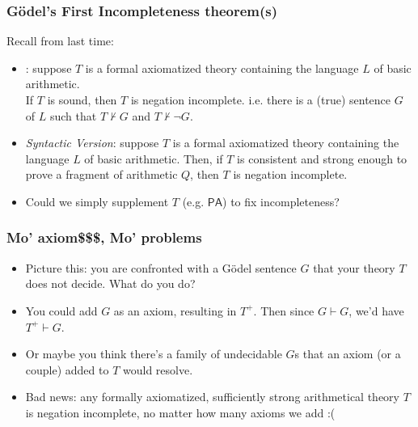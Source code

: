 \begin{frame}
\frametitle{G\"odel's First Incompleteness theorem(s)}

Recall from last time:

\begin{itemize}[<+->]

\item {}: suppose $T$ is a formal axiomatized theory containing the language $L$ of basic arithmetic. \\ If $T$ is \textcolor{OGlyallpink}{sound}, then $T$ is negation incomplete. i.e. there is a (\textcolor{OGlyallpink}{true}) sentence $G$ of $L$ such that $T \nvdash G$ and $T \nvdash \neg G$. 

\item \emph{Syntactic Version}: suppose $T$ is a formal axiomatized theory containing the language $L$ of basic arithmetic. Then, if $T$ is \textcolor{highlightA}{consistent} and \textcolor{highlightA}{strong enough to prove} a fragment of arithmetic $Q$, then $T$ is negation incomplete.

\item Could we simply supplement $T$ (e.g. $\mathsf{PA}$) to fix incompleteness?

\end{itemize}
\end{frame}

\begin{frame}
\frametitle{Mo' axiom\$\$\$, Mo' problems}

\begin{itemize}[<+->]

\item Picture this: you are confronted with a G\"odel sentence $G $ that your theory $T$ does not decide. What do you do?

\item You could add $G$ as an axiom, resulting in $T^+$. Then since $G \vdash G$, we'd have $T^+ \vdash G$. 

\item Or maybe you think there's a family of undecidable $G$s that an axiom (or a couple) added to $T$ would resolve. 

\item Bad news: any formally axiomatized, sufficiently strong arithmetical theory $T$ is negation incomplete, no matter how many axioms we add :( 

\end{itemize}
\end{frame}

